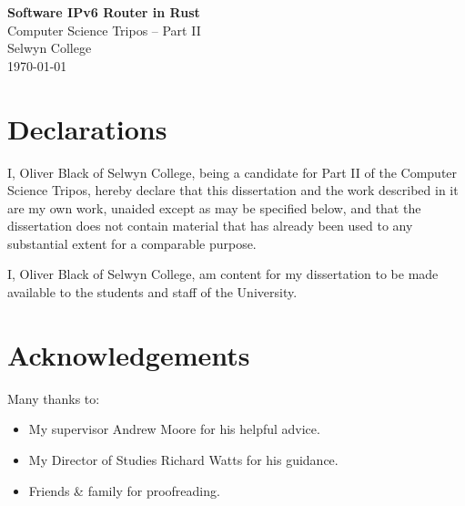 \documentclass[12pt,a4paper,twoside,openany]{report}
\begin{document}





\pagestyle{empty}



\vspace*{60mm}
\begin{center}
\Huge
\textbf{Software IPv6 Router in Rust} \\[5mm]
Computer Science Tripos -- Part II \\[5mm]
Selwyn College \\[5mm]
\today  %
\end{center}

\newpage
{}
\section*{Declarations}

I, Oliver Black of Selwyn College, being a candidate for Part II of the Computer Science Tripos, hereby declare that this dissertation and the work described in it are my own work, unaided except as may be specified below, and that the dissertation does not contain material that has already been used to any substantial extent for a comparable purpose.

\bigskip
{}

\medskip
{}

\bigskip
\bigskip

\vfill
\noindent
I, Oliver Black of Selwyn College, am content for my dissertation to be made available to the students and staff of the University.

\bigskip
{}

\medskip
{}
\vspace{0.15\textheight}

\section*{Acknowledgements}

Many thanks to:
\begin{itemize}
\item My supervisor Andrew Moore for his helpful advice.
\item My Director of Studies Richard Watts for his guidance.
\item Friends \& family for proofreading.
\end{itemize}
\vspace{0.2\textheight}
\end{document}
